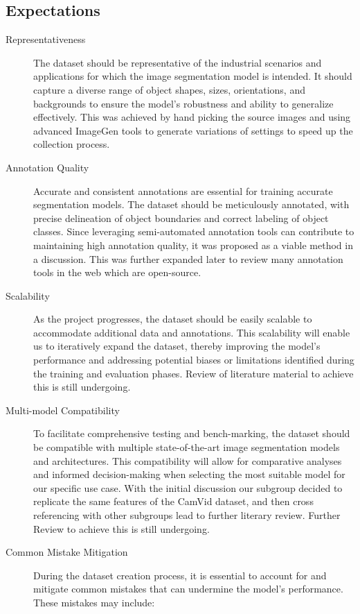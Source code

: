 \subsection{Expectations}
\begin{description}
      \item[Representativeness]
            The dataset should be representative of the industrial scenarios and applications for which the image segmentation model is intended. It should capture a diverse range of object shapes, sizes, orientations, and backgrounds to ensure the model's robustness and ability to generalize effectively. This was achieved by hand picking the source images and using advanced ImageGen tools to generate variations of settings to speed up the collection process.

      \item[Annotation Quality]
            Accurate and consistent annotations are essential for training accurate segmentation models. The dataset should be meticulously annotated, with precise delineation of object boundaries and correct labeling of object classes. Since leveraging semi-automated annotation tools can contribute to maintaining high annotation quality, it was proposed as a viable method in a discussion. This was further expanded later to review many annotation tools in the web which are open-source.

      \item[Scalability]
            As the project progresses, the dataset should be easily scalable to accommodate additional data and annotations. This scalability will enable us to iteratively expand the dataset, thereby improving the model's performance and addressing potential biases or limitations identified during the training and evaluation phases. Review of literature material to achieve this is still undergoing.

      \item[Multi-model Compatibility]
            To facilitate comprehensive testing and bench-marking, the dataset should be compatible with multiple state-of-the-art image segmentation models and architectures. This compatibility will allow for comparative analyses and informed decision-making when selecting the most suitable model for our specific use case. With the initial discussion our subgroup decided to replicate the same features of the CamVid dataset, and then cross referencing with other subgroups lead to further literary review. Further Review to achieve this is still undergoing.

      \item[Common Mistake Mitigation]
            During the dataset creation process, it is essential to account for and mitigate common mistakes that can undermine the model's performance. These mistakes may include:
\end{description}

